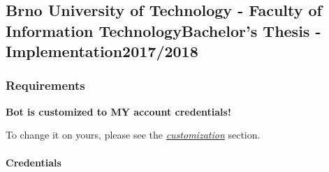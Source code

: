 \subsection{\texorpdfstring{Brno University of Technology - Faculty of
Information TechnologyBachelor's Thesis -
Implementation2017/2018}{Brno University of Technology - Faculty of Information Technology Bachelor's Thesis - Implementation 2017/2018}}\label{brno-university-of-technology---faculty-of-information-technology-bachelors-thesis---implementation-20172018}

\subsubsection{Requirements}\label{requirements}

\textbf{Bot is customized to MY account credentials!}

To change it on yours, please see the
\href{https://github.com/europ/VUTBR-FIT-BT-IMPL\#customization}{\emph{customization}}
section.

\paragraph{Credentials}\label{credentials}


